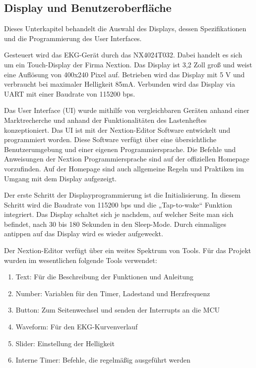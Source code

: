 
\subsection{Display und Benutzeroberfläche}

Dieses Unterkapitel behandelt die Auswahl des Displays, dessen Spezifikationen und die Programmierung des User Interfaces. 

Gesteuert wird das EKG-Gerät durch das NX4024T032. Dabei handelt es sich um ein Touch-Display der Firma Nextion. Das Display ist 3,2 Zoll groß und weist eine Auflösung von 400x240 Pixel auf. Betrieben wird das Display mit 5 V und verbraucht bei maximaler Helligkeit 85mA. Verbunden wird das Display via UART mit einer Baudrate von 115200 bps.

Das User Interface (UI) wurde mithilfe von vergleichbaren Geräten anhand einer Marktrecherche und anhand der Funktionalitäten des Lastenheftes konzeptioniert. Das UI ist mit der Nextion-Editor Software entwickelt und programmiert worden. Diese Software verfügt über eine übersichtliche Benutzerumgebung und einer eigenen Programmiersprache. Die Befehle und Anweisungen der Nextion Programmiersprache sind auf der offiziellen Homepage vorzufinden. Auf der Homepage sind auch allgemeine Regeln und Praktiken im Umgang mit dem Display aufgezeigt.

Der erste Schritt der Displayprogrammierung ist die Initialisierung. In diesem Schritt wird die Baudrate von 115200 bps und die „Tap-to-wake“ Funktion integriert. Das Display schaltet sich je nachdem, auf welcher Seite man sich befindet, nach 30 bis 180 Sekunden in den Sleep-Mode. Durch einmaliges antippen auf das Display wird es wieder aufgeweckt.

Der Nextion-Editor verfügt über ein weites Spektrum von Tools. Für das Projekt wurden im wesentlichen folgende Tools verwendet:
\begin{enumerate}
    \item Text: Für die Beschreibung der Funktionen und Anleitung
    \item Number: Variablen für den Timer, Ladestand und Herzfrequenz
    \item Button: Zum Seitenwechsel und senden der Interrupts an die MCU
    \item Waveform: Für den EKG-Kurvenverlauf
    \item Slider: Einstellung der Helligkeit
    \item Interne Timer: Befehle, die regelmäßig ausgeführt werden
\end{enumerate}

